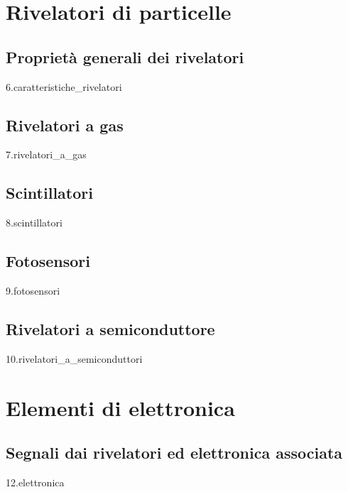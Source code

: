 \documentclass[12pt,openany]{book}
\newcommand\blankpage{%
    \null
    \thispagestyle{empty}%
    \newpage} %
\begin{document}
\afterpage{\blankpage}
\newpage

\part{Rivelatori di particelle}

\chapter{Proprietà generali dei rivelatori}\label{chap:caratteristiche_rivelatori}
{6.caratteristiche_rivelatori}

\chapter{Rivelatori a gas}
{7.rivelatori_a_gas}

\afterpage{\blankpage}
\newpage

\chapter{Scintillatori}
{8.scintillatori}

\afterpage{\blankpage}
\newpage

\chapter{Fotosensori}
{9.fotosensori}

\afterpage{\blankpage}
\newpage

\chapter{Rivelatori a semiconduttore}
{10.rivelatori_a_semiconduttori}


\part{Elementi di elettronica}

\chapter{Segnali dai rivelatori ed elettronica associata}
{12.elettronica}

\end{document}
